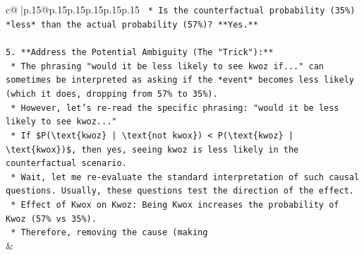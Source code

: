 \documentclass{article}
\begin{document}
{\begin{supertabular}{c@{$\;$}|p{.15\linewidth}@{}p{.15\linewidth}p{.15\linewidth}p{.15\linewidth}p{.15\linewidth}p{.15\linewidth}}
{{{\texttt{    *   Is the counterfactual probability (35\%) *less* than the actual probability (57\%)? **Yes.**} \\
\\ 
\texttt{5.  **Address the Potential Ambiguity (The "Trick"):**} \\
\texttt{    *   The phrasing "would it be less likely to see kwoz if..." can sometimes be interpreted as asking if the *event* becomes less likely (which it does, dropping from 57\% to 35\%).} \\
\texttt{    *   However, let's re{-}read the specific phrasing: "would it be less likely to see kwoz..."} \\
\texttt{    *   If \$P(\textbackslash{}text\{kwoz\} | \textbackslash{}text\{not kwox\}) < P(\textbackslash{}text\{kwoz\} | \textbackslash{}text\{kwox\})\$, then yes, seeing kwoz is less likely in the counterfactual scenario.} \\
\texttt{    *   Wait, let me re{-}evaluate the standard interpretation of such causal questions. Usually, these questions test the direction of the effect.} \\
\texttt{    *   Effect of Kwox on Kwoz: Being Kwox increases the probability of Kwoz (57\% vs 35\%).} \\
\texttt{    *   Therefore, removing the cause (making} \\
            }
        }
    }
    & \\ \\


\end{supertabular}}
\end{document}
